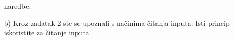 \documentclass{exam}
\begin{document}
\begin{itemize}
                                                                                                                                            naredbe.
                                                                                                                                                \item[b)]
                                                                                                                                                Kroz
                                                                                                                                                zadatak
                                                                                                                                                2
                                                                                                                                                ste
                                                                                                                                                se
                                                                                                                                                upoznali
                                                                                                                                                s
                                                                                                                                                načinima
                                                                                                                                                čitanja
                                                                                                                                                inputa.
                                                                                                                                                Isti
                                                                                                                                                princip
                                                                                                                                                iskoristite
                                                                                                                                                za
                                                                                                                                                čitanje
                                                                                                                                                inputa

\end{itemize}
\end{document}
